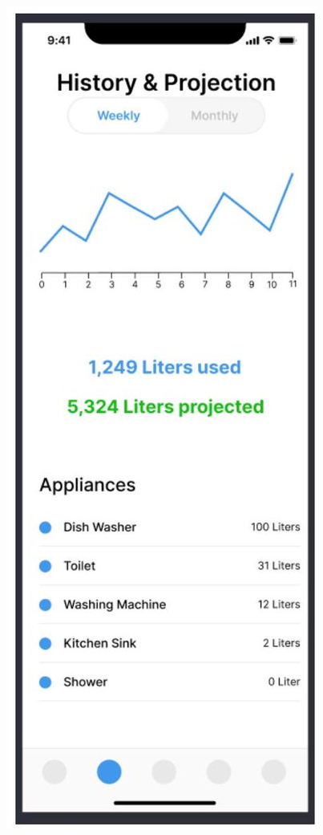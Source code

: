 \documentclass[10pt]{article}
\begin{document}
\includegraphics[max width=\textwidth]{2022_11_16_e80008f3d60227bff292g-6(2)}
\end{document}
